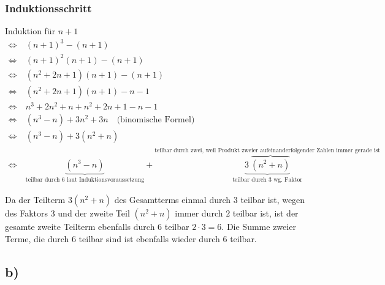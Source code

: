 \documentclass[11pt,a4paper]{article}
\begin{document}
\subsubsection*{Induktionsschritt}
Induktion für \(n+1\)
\begin{align*}
\Leftrightarrow & ~ (n+1)^3 - (n+1) \\
\Leftrightarrow & ~ (n+1)^2(n+1) - (n+1) \\
\Leftrightarrow & ~ (n^2 + 2n + 1)(n+1) - (n + 1) \\
\Leftrightarrow & ~ (n^2 + 2n + 1)(n+1) - n - 1 \\
\Leftrightarrow & ~ n^3 + 2n^2 + n + n^2 + 2n + 1  -n -1 \\
\Leftrightarrow & ~ (n^3 - n) + 3n^2 + 3n \text{~~~(binomische Formel)} \\
\Leftrightarrow & ~ (n^3 - n) + 3(n^2 + n) \\
\Leftrightarrow & ~ \underbrace{(n^3 - n)}_\text{teilbar durch 6 laut Induktionsvoraussetzung} + \underbrace{3~ \overbrace{(n^2 + n)}}_\text{teilbar durch 3 wg. Faktor}^\text{teilbar durch zwei, weil Produkt zweier aufeinanderfolgender Zahlen immer gerade ist}
\end{align*}

Da der Teilterm \(3(n^2 + n)\) des Gesamtterms einmal durch \(3\) teilbar ist, wegen des Faktors \(3\) und der zweite Teil \((n^2+n)\) immer durch \(2\) teilbar ist, ist der gesamte zweite Teilterm ebenfalls durch \(6\) teilbar \( 2 \cdot 3 = 6\). Die Summe zweier Terme, die durch 6 teilbar sind ist ebenfalls wieder durch 6 teilbar. 


\subsection*{b)}
\end{document}
